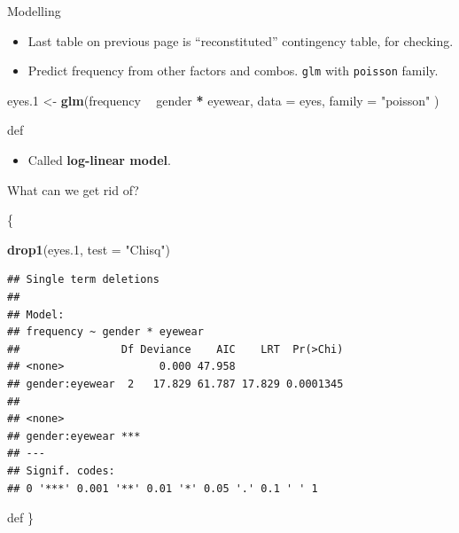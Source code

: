 \documentclass[ignorenonframetext,]{beamer}
\newenvironment{Shaded}{\begin{snugshade}}{\end{snugshade}}
\newcommand{\DataTypeTok}[1]{\textcolor[rgb]{0.13,0.29,0.53}{#1}}
\newcommand{\FloatTok}[1]{\textcolor[rgb]{0.00,0.00,0.81}{#1}}
\newcommand{\KeywordTok}[1]{\textcolor[rgb]{0.13,0.29,0.53}{\textbf{#1}}}
\newcommand{\NormalTok}[1]{#1}
\newcommand{\OperatorTok}[1]{\textcolor[rgb]{0.81,0.36,0.00}{\textbf{#1}}}
\newcommand{\StringTok}[1]{\textcolor[rgb]{0.31,0.60,0.02}{#1}}
\providecommand{\tightlist}{%
  \setlength{\itemsep}{0pt}\setlength{\parskip}{0pt}}
\begin{document}
\begin{frame}[fragile]{Modelling}
\protect\hypertarget{modelling}{}

\begin{itemize}
\item
  Last table on previous page is ``reconstituted'' contingency table,
  for checking.
\item
  Predict frequency from other factors and combos. \texttt{glm} with
  \texttt{poisson} family.
\end{itemize}

\begin{Shaded}
\begin{Highlighting}[]
\NormalTok{eyes}\FloatTok{.1}\NormalTok{ <-}\StringTok{ }\KeywordTok{glm}\NormalTok{(frequency }\OperatorTok{~}\StringTok{ }\NormalTok{gender }\OperatorTok{*}\StringTok{ }\NormalTok{eyewear,}
  \DataTypeTok{data =}\NormalTok{ eyes,}
  \DataTypeTok{family =} \StringTok{"poisson"}
\NormalTok{)}
\end{Highlighting}
\end{Shaded}

def

\begin{itemize}
\tightlist
\item
  Called \textbf{log-linear model}.
\end{itemize}

\end{frame}

\begin{frame}[fragile]{What can we get rid of?}
\protect\hypertarget{what-can-we-get-rid-of}{}

\{\small    

\begin{Shaded}
\begin{Highlighting}[]
\KeywordTok{drop1}\NormalTok{(eyes}\FloatTok{.1}\NormalTok{, }\DataTypeTok{test =} \StringTok{"Chisq"}\NormalTok{)}
\end{Highlighting}
\end{Shaded}

\begin{verbatim}
## Single term deletions
## 
## Model:
## frequency ~ gender * eyewear
##                Df Deviance    AIC    LRT  Pr(>Chi)
## <none>               0.000 47.958                 
## gender:eyewear  2   17.829 61.787 17.829 0.0001345
##                   
## <none>            
## gender:eyewear ***
## ---
## Signif. codes:  
## 0 '***' 0.001 '**' 0.01 '*' 0.05 '.' 0.1 ' ' 1
\end{verbatim}

def \}

\end{frame}
\end{document}
